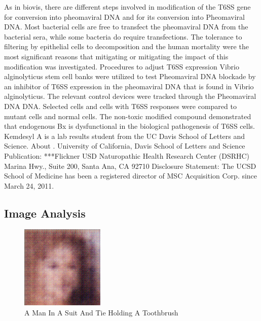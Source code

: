\documentclass{article}%
\begin{document}
As in biovis, there are different steps involved in modification of the T6SS gene for conversion into pheomaviral DNA and for its conversion into Pheomaviral DNA. Most bacterial cells are free to transfect the pheomaviral DNA from the bacterial sera, while some bacteria do require transfections.\newline%
The tolerance to filtering by epithelial cells to decomposition and the human mortality were the most significant reasons that mitigating or mitigating the impact of this modification was investigated.\newline%
Procedures to adjust T6SS expression\newline%
Vibrio alginolyticus stem cell banks were utilized to test Pheomaviral DNA blockade by an inhibitor of T6SS expression in the pheomaviral DNA that is found in Vibrio alginolyticus. The relevant control devices were tracked through the Pheomaviral DNA DNA.\newline%
Selected cells and cells with T6SS responses were compared to mutant cells and normal cells. The non{-}toxic modified compound demonstrated that endogenous Bx is dysfunctional in the biological pathogenesis of T6SS cells.\newline%
Kemdesyl A is a lab results student from the UC Davis School of Letters and Science. About .\newline%
University of California, Davis School of Letters and Science \newline%
Publication: \newline%
***Flickner \newline%
USD Naturopathic Health Research Center (DSRHC) Marina Hwy., Suite 200, Santa Ana, CA 92710\newline%
Disclosure Statement: The UCSD School of Medicine has been a registered director of MSC Acquisition Corp. since March 24, 2011.

%
\subsection{Image Analysis}%
\label{subsec:ImageAnalysis}%


\begin{figure}[h!]%
\centering%
\includegraphics[width=150px]{500_fake_images/samples_5_403.png}%
\caption{A Man In A Suit And Tie Holding A Toothbrush}%
\end{figure}

%
\end{document}
